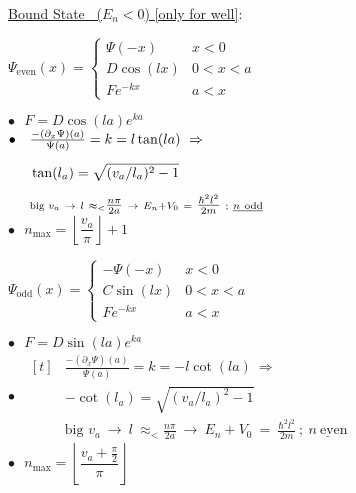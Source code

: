 \documentclass[12pt]{article}
\begin{document}
\vspace{15pt} \noindent
\underline{Bound State \ (\(E_n<0\)) {\scriptsize[only for well]}}:\\[15pt]
\begin{minipage}[t]{.5\textwidth}
    \setlength{\parindent}{.5cm}
    \(\Psi_\text{even}(x) = \begin{cases}
        \Psi(-x)    &   x < 0\\[5pt]
        D \cos(lx)   &   0 < x < a \\[5pt]
        F e^{-kx}   &   a < x 
    \end{cases}\)
    
    \vspace{20pt}
    \(\bullet \ \ \ F = D \cos(la) e^{ka}\)\\[10pt]
    \indent \(\bullet \ \ \ \begin{aligned}[t]
        &\tfrac{-(\partial_x \Psi)(a)}{\Psi(a)} = k = l \tan(la) \ \Rightarrow\\[5pt]
        &\tan(l_a) = \sqrt{ (v_a / l_a)^2 - 1}
            \indent \ \ \\[5pt]
        &\scriptstyle \text{big } v_a \ \rightarrow \ l\ \approx_< \tfrac{n \pi}{2a}
            \ \rightarrow \ E_n + V_0\ =\ \tfrac{\hbar^2 l^2}{2m}\ ;\ \underline{n\ \text{odd}}
    \end{aligned}\)\\[5pt]
    \indent \(\bullet \ \ \ \boxed{ n_\text{max} = \left\lfloor \dfrac{v_a}{\pi} \right\rfloor + 1} \)
\end{minipage}
\begin{minipage}[t]{.5\textwidth}
    \setlength{\parindent}{.5cm}
    \(\Psi_\text{odd}(x) = \begin{cases}
        - \Psi(-x)    &   x < 0\\[5pt]
        C \sin(lx)   &   0 < x < a \\[5pt]
        F e^{-kx}   &   a < x 
    \end{cases}\)
    
    \vspace{20pt}
    \(\bullet \ \ \ F = D \sin(la) e^{ka}\)\\[10pt]
    \indent \(\bullet \ \ \ \begin{aligned}[t]
        &\tfrac{-(\partial_x \Psi)(a)}{\Psi(a)} = k = - l \cot(la) \ \Rightarrow\\[5pt]
        &-\cot(l_a) = \sqrt{ (v_a / l_a)^2 - 1} \\[5pt]
        &\scriptstyle \text{big } v_a \ \rightarrow \ l\ \approx_< \tfrac{n \pi}{2a}
            \ \rightarrow \ E_n + V_0\ =\ \tfrac{\hbar^2 l^2}{2m}\ ;\ \underline{n\ \text{even}}
    \end{aligned}\)\\[5pt]  
    \indent\(\bullet \ \ \ \boxed{ n_\text{max} = \left\lfloor \dfrac{v_a + \tfrac{\pi}{2}}{\pi} \right\rfloor } \) 
\end{minipage}
\end{document}

